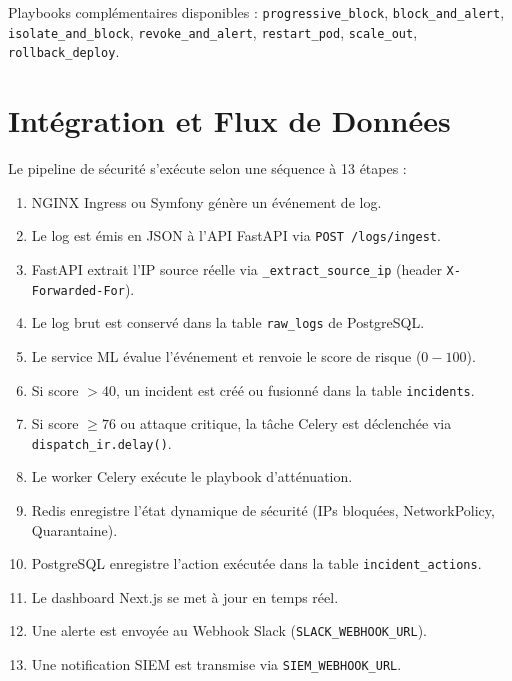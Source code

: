 \documentclass[12pt,a4paper]{report}
\begin{document}
Playbooks complémentaires disponibles : \texttt{progressive\_block}, \texttt{block\_and\_alert}, \texttt{isolate\_and_block}, \texttt{revoke\_and\_alert}, \texttt{restart\_pod}, \texttt{scale\_out}, \texttt{rollback\_deploy}.

\chapter{Intégration et Flux de Données}
Le pipeline de sécurité s'exécute selon une séquence à 13 étapes :
\begin{enumerate}
    \item NGINX Ingress ou Symfony génère un événement de log.
    \item Le log est émis en JSON à l'API FastAPI via \texttt{POST /logs/ingest}.
    \item FastAPI extrait l'IP source réelle via \texttt{\_extract\_source\_ip} (header \texttt{X-Forwarded-For}).
    \item Le log brut est conservé dans la table \texttt{raw\_logs} de PostgreSQL.
    \item Le service ML évalue l'événement et renvoie le score de risque ($0 - 100$).
    \item Si score $> 40$, un incident est créé ou fusionné dans la table \texttt{incidents}.
    \item Si score $\ge 76$ ou attaque critique, la tâche Celery est déclenchée via \texttt{dispatch\_ir.delay()}.
    \item Le worker Celery exécute le playbook d'atténuation.
    \item Redis enregistre l'état dynamique de sécurité (IPs bloquées, NetworkPolicy, Quarantaine).
    \item PostgreSQL enregistre l'action exécutée dans la table \texttt{incident\_actions}.
    \item Le dashboard Next.js se met à jour en temps réel.
    \item Une alerte est envoyée au Webhook Slack (\texttt{SLACK\_WEBHOOK\_URL}).
    \item Une notification SIEM est transmise via \texttt{SIEM\_WEBHOOK\_URL}.
\end{enumerate}

\end{document}
